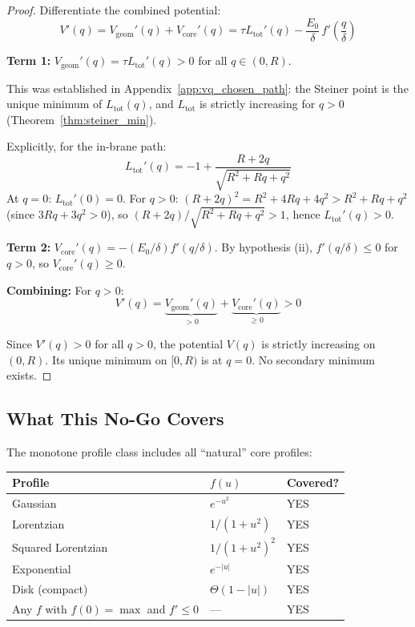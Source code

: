 \begin{proof}
Differentiate the combined potential:
\begin{equation}
    V'(q) = V_{\mathrm{geom}}'(q) + V_{\mathrm{core}}'(q)
    = \tau L_{\mathrm{tot}}'(q) - \frac{E_0}{\delta}\, f'\!\left(\frac{q}{\delta}\right)
    \label{eq:N7_Vprime}
\end{equation}

\textbf{Term 1:} $V_{\mathrm{geom}}'(q) = \tau L_{\mathrm{tot}}'(q) > 0$
for all $q \in (0, R)$.

This was established in Appendix~\ref{app:vq_chosen_path}: the Steiner
point is the unique minimum of $L_{\mathrm{tot}}(q)$, and
$L_{\mathrm{tot}}$ is strictly increasing for $q > 0$
(Theorem~\ref{thm:steiner_min}).

Explicitly, for the in-brane path:
\begin{equation}
    L_{\mathrm{tot}}'(q) = -1 + \frac{R + 2q}{\sqrt{R^2 + Rq + q^2}}
    \label{eq:N7_Ltot_prime}
\end{equation}
At $q = 0$: $L_{\mathrm{tot}}'(0) = 0$. For $q > 0$:
$(R + 2q)^2 = R^2 + 4Rq + 4q^2 > R^2 + Rq + q^2$ (since
$3Rq + 3q^2 > 0$), so $(R+2q)/\sqrt{R^2+Rq+q^2} > 1$, hence
$L_{\mathrm{tot}}'(q) > 0$. \tagDc

\textbf{Term 2:} $V_{\mathrm{core}}'(q) = -(E_0/\delta) f'(q/\delta)$.
By hypothesis (ii), $f'(q/\delta) \leq 0$ for $q > 0$, so
$V_{\mathrm{core}}'(q) \geq 0$.

\textbf{Combining:} For $q > 0$:
\begin{equation}
    V'(q) = \underbrace{V_{\mathrm{geom}}'(q)}_{> 0}
           + \underbrace{V_{\mathrm{core}}'(q)}_{\geq 0}
           > 0
    \label{eq:N7_Vprime_positive}
\end{equation}

Since $V'(q) > 0$ for all $q > 0$, the potential $V(q)$ is strictly
increasing on $(0, R)$. Its unique minimum on $[0, R)$ is at $q = 0$.
No secondary minimum exists.
\end{proof}

\subsection{What This No-Go Covers}

The monotone profile class includes all ``natural'' core profiles:
\begin{center}
\begin{tabular}{lll}
\toprule
\textbf{Profile} & \textbf{$f(u)$} & \textbf{Covered?} \\
\midrule
Gaussian & $e^{-u^2}$ & YES \\
Lorentzian & $1/(1+u^2)$ & YES \\
Squared Lorentzian & $1/(1+u^2)^2$ & YES \\
Exponential & $e^{-|u|}$ & YES \\
Disk (compact) & $\Theta(1-|u|)$ & YES \\
Any $f$ with $f(0) = \max$ and $f' \leq 0$ & --- & YES \\
\bottomrule
\end{tabular}
\end{center}


